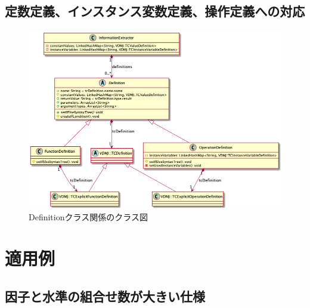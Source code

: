 \documentclass[uplatex, report, a4j, 10pt]{jsbook}
\begin{document}
\section{定数定義、インスタンス変数定義、操作定義への対応}

\begin{figure}[tp]
  \centering
  \includegraphics[keepaspectratio, width=160mm]{figs/Definition_class_diagram}
  \caption{Definitionクラス関係のクラス図}
  \label{fig:definition_class}
\end{figure}

\chapter{適用例}\label{cha:Indication}
\section{因子と水準の組合せ数が大きい仕様}
\end{document}
